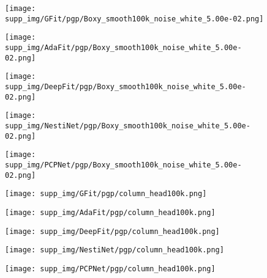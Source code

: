 \documentclass[runningheads]{llncs}
\begin{document}
\begin{figure*}
\centering
	\begin{subfigure}{0.15\linewidth}
		\centering
		\texttt{[image: supp\_img/GFit/pgp/Boxy\_smooth100k\_noise\_white\_5.00e-02.png]}
\end{subfigure}
	\hspace{0.1cm}
	\begin{subfigure}{0.15\linewidth}
		\centering
		\texttt{[image: supp\_img/AdaFit/pgp/Boxy\_smooth100k\_noise\_white\_5.00e-02.png]}
\end{subfigure}
	\hspace{0.1cm}
	\begin{subfigure}{0.17\linewidth}
		\centering
		\texttt{[image: supp\_img/DeepFit/pgp/Boxy\_smooth100k\_noise\_white\_5.00e-02.png]}
\end{subfigure}
	\hspace{0.1cm}
	\begin{subfigure}{0.17\linewidth}
		\centering
		\texttt{[image: supp\_img/NestiNet/pgp/Boxy\_smooth100k\_noise\_white\_5.00e-02.png]}
\end{subfigure}
	\hspace{0.1cm}
	\begin{subfigure}{0.17\linewidth}
		\centering
		\texttt{[image: supp\_img/PCPNet/pgp/Boxy\_smooth100k\_noise\_white\_5.00e-02.png]}
\end{subfigure}
	
\begin{subfigure}{0.15\linewidth}
		\centering
		\texttt{[image: supp\_img/GFit/pgp/column\_head100k.png]}
\end{subfigure}
	\hspace{0.1cm}
	\begin{subfigure}{0.15\linewidth}
		\centering
		\texttt{[image: supp\_img/AdaFit/pgp/column\_head100k.png]}
\end{subfigure}
	\hspace{0.1cm}
	\begin{subfigure}{0.17\linewidth}
		\centering
		\texttt{[image: supp\_img/DeepFit/pgp/column\_head100k.png]}
\end{subfigure}
	\hspace{0.1cm}
	\begin{subfigure}{0.17\linewidth}
		\centering
		\texttt{[image: supp\_img/NestiNet/pgp/column\_head100k.png]}
\end{subfigure}
	\hspace{0.1cm}
	\begin{subfigure}{0.17\linewidth}
		\centering
		\texttt{[image: supp\_img/PCPNet/pgp/column\_head100k.png]}
\end{subfigure}
	

\end{figure*}
\end{document}

